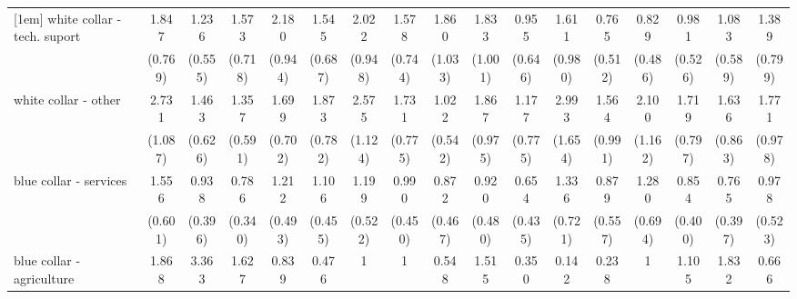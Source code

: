{\begin{tabular}{l*{16}{c}}
[1em]
white collar - tech. suport&       1.847         &       1.236         &       1.573         &       2.180         &       1.545         &       2.022         &       1.578         &       1.860         &       1.833         &       0.955         &       1.611         &       0.765         &       0.829         &       0.981         &       1.083         &       1.389         \\
                    &     (0.769)         &     (0.555)         &     (0.718)         &     (0.944)         &     (0.687)         &     (0.948)         &     (0.744)         &     (1.033)         &     (1.001)         &     (0.646)         &     (0.980)         &     (0.512)         &     (0.486)         &     (0.526)         &     (0.589)         &     (0.799)         \\
[1em]
white collar - other&       2.731\sym{*}  &       1.463         &       1.357         &       1.699         &       1.873         &       2.575\sym{*}  &       1.731         &       1.022         &       1.867         &       1.177         &       2.993\sym{*}  &       1.564         &       2.100         &       1.719         &       1.636         &       1.771         \\
                    &     (1.087)         &     (0.626)         &     (0.591)         &     (0.702)         &     (0.782)         &     (1.124)         &     (0.775)         &     (0.542)         &     (0.975)         &     (0.775)         &     (1.654)         &     (0.991)         &     (1.162)         &     (0.797)         &     (0.863)         &     (0.978)         \\
[1em]
blue collar - services&       1.556         &       0.938         &       0.786         &       1.212         &       1.106         &       1.199         &       0.990         &       0.872         &       0.920         &       0.654         &       1.336         &       0.879         &       1.280         &       0.854         &       0.765         &       0.978         \\
                    &     (0.601)         &     (0.396)         &     (0.340)         &     (0.493)         &     (0.455)         &     (0.522)         &     (0.450)         &     (0.467)         &     (0.480)         &     (0.435)         &     (0.721)         &     (0.557)         &     (0.694)         &     (0.400)         &     (0.397)         &     (0.523)         \\
[1em]
blue collar - agriculture&       1.868         &       3.363         &       1.627         &       0.839         &       0.476         &           1         &           1         &       0.548         &       1.515         &       0.350         &       0.142         &       0.238         &           1         &       1.105         &       1.832         &       0.666         \\

\end{tabular}}
